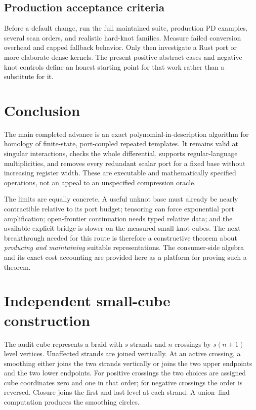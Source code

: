 \documentclass[11pt,letterpaper]{article}
\theoremstyle{definition}
\theoremstyle{remark}
\numberwithin{equation}{section}
\begin{document}
\subsection{Production acceptance criteria}
Before a default change, run the full maintained suite, production
PD examples, several scan orders, and realistic hard-knot families.
Measure failed conversion overhead and capped fallback behavior. Only
then investigate a Rust port or more elaborate dense kernels. The present
positive abstract cases and negative knot controls define an honest
starting point for that work rather than a substitute for it.

\section{Conclusion}
The main completed advance is an exact polynomial-in-description algorithm
for homology of finite-state, port-coupled repeated templates. It remains
valid at singular interactions, checks the whole differential, supports
regular-language multiplicities, and removes every redundant scalar port
for a fixed base without increasing register width. These are executable
and mathematically specified operations, not an appeal to an unspecified
compression oracle.

The limits are equally concrete. A useful unknot base must already be
nearly contractible relative to its port budget; tensoring can force
exponential port amplification; open-frontier continuation needs typed
relative data; and the available explicit bridge is slower on the measured
small knot cubes. The next breakthrough needed for this route is therefore
a constructive theorem about \emph{producing and maintaining} suitable
representations. The consumer-side algebra and its exact cost accounting
are provided here as a platform for proving such a theorem.

\appendix
\section{Independent small-cube construction}
\label{app:cube}
The audit cube represents a braid with $s$ strands and $n$ crossings by
$s(n+1)$ level vertices. Unaffected strands are joined vertically. At an
active crossing, a smoothing either joins the two strands vertically or
joins the two upper endpoints and the two lower endpoints. For positive
crossings the two choices are assigned cube coordinates zero and one in
that order; for negative crossings the order is reversed. Closure joins
the first and last level at each strand. A union--find computation produces
the smoothing circles.
\end{document}
